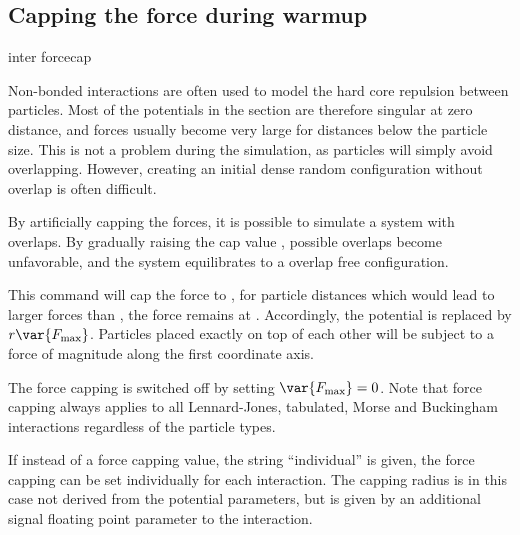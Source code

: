 \subsection{Capping the force during warmup}
\label{sec:forcecap}

\begin{essyntax}
   inter forcecap 
\end{essyntax}

Non-bonded interactions are often used to model the hard core
repulsion between particles. Most of the potentials in the section are
therefore singular at zero distance, and forces usually become very
large for distances below the particle size. This is not a problem
during the simulation, as particles will simply avoid overlapping.
However, creating an initial dense random configuration without
overlap is often difficult.

By artificially capping the forces, it is possible to simulate a
system with overlaps. By gradually raising the cap value
, possible overlaps become unfavorable, and the
system equilibrates to a overlap free configuration.

This command will cap the force to , \ie for
particle distances which would lead to larger forces than
, the force remains at .
Accordingly, the potential is replaced by $r \var{F_\mathrm{max}}$.
Particles placed exactly on top of each other will be subject to a
force of magnitude  along the first coordinate axis.

The force capping is switched off by setting $\var{F_\mathrm{max}}=0$.
Note that force capping always applies to all Lennard-Jones, tabulated,
Morse and Buckingham interactions regardless of the particle types.

If instead of a force capping value, the string ``individual'' is
given, the force capping can be set individually for each
interaction. The capping radius is in this case not derived from the
potential parameters, but is given by an additional signal floating
point parameter to the interaction.

